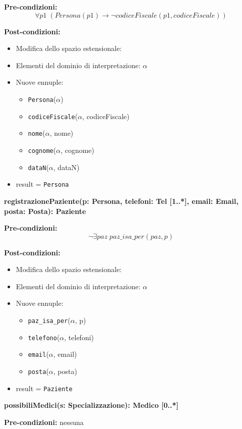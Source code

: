 \documentclass{article}
\begin{document}
\textbf{Pre-condizioni:} 
\[
\forall p1 \; (Persona(p1) \rightarrow \neg codiceFiscale(p1,codiceFiscale))
\]

\textbf{Post-condizioni:}
\begin{itemize}
    \item Modifica dello spazio estensionale:
    \item Elementi del dominio di interpretazione: \( \alpha \)
    \item Nuove ennuple:
    \begin{itemize}
        \item \texttt{Persona}(\(\alpha\))
        \item \texttt{codiceFiscale}(\(\alpha\), codiceFiscale)
        \item \texttt{nome}(\(\alpha\), nome)
        \item \texttt{cognome}(\(\alpha\), cognome)
        \item \texttt{dataN}(\(\alpha\), dataN)
    \end{itemize}
    \item result = \texttt{Persona}
\end{itemize}

\textbf{registrazionePaziente(p: Persona, telefoni: Tel [1..*], email: Email, posta: Posta): Paziente}

\textbf{Pre-condizioni:} 
\[
\neg \exists paz \; paz\_isa\_per(paz,p)
\]

\textbf{Post-condizioni:}
\begin{itemize}
    \item Modifica dello spazio estensionale:
    \item Elementi del dominio di interpretazione: \( \alpha \)
    \item Nuove ennuple:
    \begin{itemize}
        \item \texttt{paz\_isa\_per}(\(\alpha\), p)
        \item \texttt{telefono}(\(\alpha\), telefoni)
        \item \texttt{email}(\(\alpha\), email)
        \item \texttt{posta}(\(\alpha\), posta)
    \end{itemize}
    \item result = \texttt{Paziente}
\end{itemize}

\textbf{possibiliMedici(s: Specializzazione): Medico [0..*]}

\textbf{Pre-condizioni:} nessuna
\end{document}
